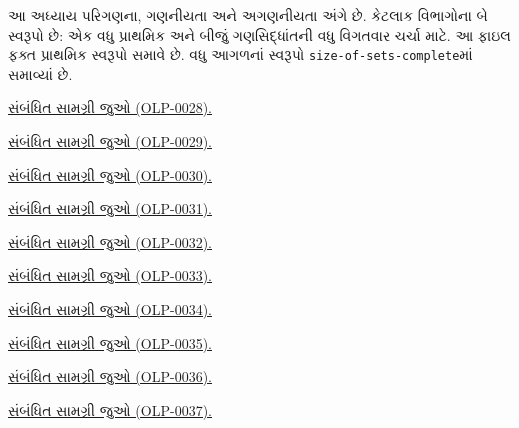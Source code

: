 \begin{editorial}
આ અધ્યાય પરિગણના, ગણનીયતા અને અગણનીયતા અંગે છે.
કેટલાક વિભાગોના બે સ્વરૂપો છે:
એક વધુ પ્રાથમિક અને બીજું ગણસિદ્ધાંતની વધુ વિગતવાર ચર્ચા માટે.
આ ફાઇલ ફક્ત પ્રાથમિક સ્વરૂપો સમાવે છે.
વધુ આગળનાં સ્વરૂપો \verb|size-of-sets-complete|માં સમાવ્યાં છે.
\end{editorial}

\begingroup
\makeatletter{}\makeatother
\noindent\hyperref[guunit:OLP-0028]{સંબંધિત સામગ્રી જુઓ (OLP-0028).}\par
\endgroup


\begingroup
\makeatletter{}\makeatother
\noindent\hyperref[guunit:OLP-0029]{સંબંધિત સામગ્રી જુઓ (OLP-0029).}\par
\endgroup


\begingroup
\makeatletter{}\makeatother
\noindent\hyperref[guunit:OLP-0030]{સંબંધિત સામગ્રી જુઓ (OLP-0030).}\par
\endgroup


\begingroup
\makeatletter{}\makeatother
\noindent\hyperref[guunit:OLP-0031]{સંબંધિત સામગ્રી જુઓ (OLP-0031).}\par
\endgroup


\begingroup
\makeatletter{}\makeatother
\noindent\hyperref[guunit:OLP-0032]{સંબંધિત સામગ્રી જુઓ (OLP-0032).}\par
\endgroup


\begingroup
\makeatletter{}\makeatother
\noindent\hyperref[guunit:OLP-0033]{સંબંધિત સામગ્રી જુઓ (OLP-0033).}\par
\endgroup


\begingroup
\makeatletter{}\makeatother
\noindent\hyperref[guunit:OLP-0034]{સંબંધિત સામગ્રી જુઓ (OLP-0034).}\par
\endgroup


\begingroup
\makeatletter{}\makeatother
\noindent\hyperref[guunit:OLP-0035]{સંબંધિત સામગ્રી જુઓ (OLP-0035).}\par
\endgroup


\begingroup
\makeatletter{}\makeatother
\noindent\hyperref[guunit:OLP-0036]{સંબંધિત સામગ્રી જુઓ (OLP-0036).}\par
\endgroup


\begingroup
\makeatletter{}\makeatother
\noindent\hyperref[guunit:OLP-0037]{સંબંધિત સામગ્રી જુઓ (OLP-0037).}\par
\endgroup


\OLEndChapterHook
\endgroup


\OLEndPartHook
\endgroup

